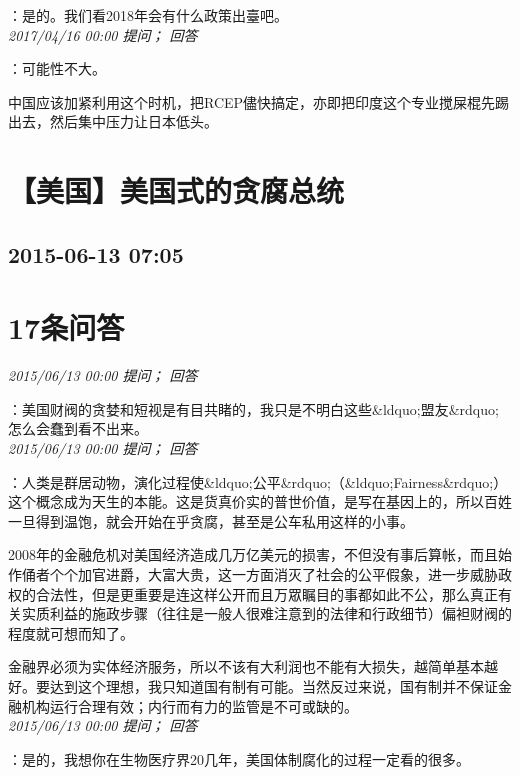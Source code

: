 \documentclass[twocolumn]{ctexart}
\begin{document}
：是的。我们看2018年会有什么政策出臺吧。\\

\textit{\hfill\noindent\small 2017/04/16 00:00 提问； 回答}

：可能性不大。

中国应该加紧利用这个时机，把RCEP儘快搞定，亦即把印度这个专业搅屎棍先踢出去，然后集中压力让日本低头。\\


\section{【美国】美国式的贪腐总统}
\subsection{2015-06-13 07:05}


\section{17条问答}

\textit{\hfill\noindent\small 2015/06/13 00:00 提问； 回答}

：美国财阀的贪婪和短视是有目共睹的，我只是不明白这些\&ldquo;盟友\&rdquo;怎么会蠢到看不出来。\\

\textit{\hfill\noindent\small 2015/06/13 00:00 提问； 回答}

：人类是群居动物，演化过程使\&ldquo;公平\&rdquo;（\&ldquo;Fairness\&rdquo;）这个概念成为天生的本能。这是货真价实的普世价值，是写在基因上的，所以百姓一旦得到温饱，就会开始在乎贪腐，甚至是公车私用这样的小事。

2008年的金融危机对美国经济造成几万亿美元的损害，不但没有事后算帐，而且始作俑者个个加官进爵，大富大贵，这一方面消灭了社会的公平假象，进一步威胁政权的合法性，但是更重要是连这样公开而且万眾瞩目的事都如此不公，那么真正有关实质利益的施政步骤（往往是一般人很难注意到的法律和行政细节）偏袒财阀的程度就可想而知了。

金融界必须为实体经济服务，所以不该有大利润也不能有大损失，越简单基本越好。要达到这个理想，我只知道国有制有可能。当然反过来说，国有制并不保证金融机构运行合理有效；内行而有力的监管是不可或缺的。\\

\textit{\hfill\noindent\small 2015/06/13 00:00 提问； 回答}

：是的，我想你在生物医疗界20几年，美国体制腐化的过程一定看的很多。
\end{document}
